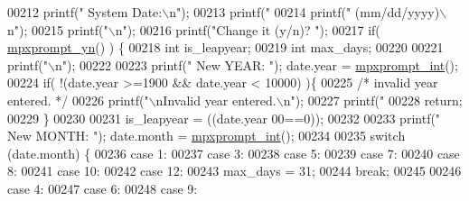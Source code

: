 \begin{DoxyCode}
{{{{{{{{{{{00212         printf(\textcolor{stringliteral}{"  System Date:\(\backslash\)n"});
00213         printf(\textcolor{stringliteral}{"    %
00214         printf(\textcolor{stringliteral}{"   (mm/dd/yyyy)\(\backslash\)n"});
00215         printf(\textcolor{stringliteral}{"\(\backslash\)n"});
00216         printf(\textcolor{stringliteral}{"Change it (y/n)? "});
00217         \textcolor{keywordflow}{if}( \hyperlink{mpx__util_8c_a8e31250a20e8bc8e7106f5a37c391199}{mpxprompt_yn}() ) \{
00218                 \textcolor{keywordtype}{int} is\_leapyear;
00219                 \textcolor{keywordtype}{int} max\_days;
00220 
00221                 printf(\textcolor{stringliteral}{"\(\backslash\)n"});
00222 
00223                 printf(\textcolor{stringliteral}{"  New YEAR:  "}); date.year      = \hyperlink{mpx__util_8c_aacc3dfe470919b0bd1133bce90383e18}{mpxprompt_int}();
00224                 \textcolor{keywordflow}{if}( !(date.year >=1900 && date.year < 10000) )\{
00225                         \textcolor{comment}{/* invalid year entered. */}
00226                         printf(\textcolor{stringliteral}{"\(\backslash\)nInvalid year entered.\(\backslash\)n"});
00227                         printf(\textcolor{stringliteral}{"%
00228                         \textcolor{keywordflow}{return};
00229                 \}
00230 
00231                 is\_leapyear = ((date.year%
      00==0));
00232 
00233                 printf(\textcolor{stringliteral}{"  New MONTH: "}); date.month     = \hyperlink{mpx__util_8c_aacc3dfe470919b0bd1133bce90383e18}{mpxprompt_int}();
00234 
00235                 \textcolor{keywordflow}{switch} (date.month) \{
00236                         \textcolor{keywordflow}{case} 1:
00237                         \textcolor{keywordflow}{case} 3:
00238                         \textcolor{keywordflow}{case} 5:
00239                         \textcolor{keywordflow}{case} 7:
00240                         \textcolor{keywordflow}{case} 8:
00241                         \textcolor{keywordflow}{case} 10:
00242                         \textcolor{keywordflow}{case} 12:
00243                                 max\_days = 31;
00244                         \textcolor{keywordflow}{break};
00245 
00246                         \textcolor{keywordflow}{case} 4:
00247                         \textcolor{keywordflow}{case} 6:
00248                         \textcolor{keywordflow}{case} 9:
}}}}}}}}}}}}}
\end{DoxyCode}
